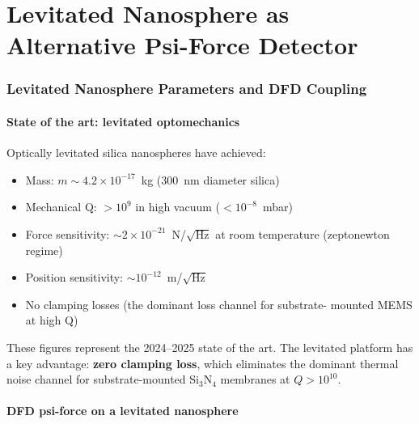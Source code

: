 \documentclass[11pt]{article}
\newcommand{\ee}[1]{\times 10^{#1}}
\theoremstyle{definition}
\theoremstyle{remark}
\begin{document}
\part{Levitated Nanosphere as Alternative Psi-Force Detector}
\label{part:levitated}


\section{Levitated Nanosphere Parameters and DFD Coupling}
\label{sec:levitated}

\subsection{State of the art: levitated optomechanics}

Optically levitated silica nanospheres have achieved:
\begin{itemize}[nosep]
\item Mass: $m \sim 4.2\ee{-17}$~kg (300~nm diameter silica)
\item Mechanical Q: $> 10^{9}$ in high vacuum ($< 10^{-8}$~mbar)
\item Force sensitivity: $\sim 2\ee{-21}$~N/$\sqrt{\text{Hz}}$ at
  room temperature (zeptonewton regime)
\item Position sensitivity: $\sim 10^{-12}$~m/$\sqrt{\text{Hz}}$
\item No clamping losses (the dominant loss channel for substrate-
  mounted MEMS at high Q)
\end{itemize}

These figures represent the 2024--2025 state of the art. The levitated
platform has a key advantage: \textbf{zero clamping loss}, which
eliminates the dominant thermal noise channel for substrate-mounted
Si$_3$N$_4$ membranes at $Q > 10^{10}$.

\subsection{DFD psi-force on a levitated nanosphere}
\end{document}
